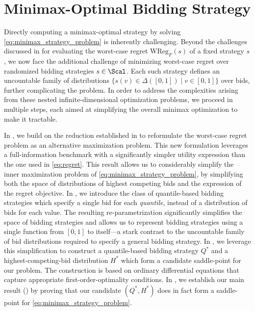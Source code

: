 

\section{Minimax-Optimal Bidding Strategy}\label{sec:minimax}

Directly computing a minimax-optimal strategy by solving \eqref{eq:minimax_strategy_problem} is inherently challenging. Beyond the challenges discussed in  for evaluating the worst-case regret  $\mathrm{WReg}_F(s)$ of a fixed strategy $s$, we now face the additional challenge of minimizing worst-case regret over randomized bidding strategies $s \in \Scal$. Each such strategy defines an uncountable family of distributions $\{s(v) \in \Delta([0,1]) \mid v \in [0,1] \}$ over bids, further complicating the problem. 
In order to address the complexities arising from these nested infinite-dimensional optimization problems, we proceed in multiple steps, each aimed at simplifying the overall minimax optimization to make it tractable. 

In , we build on the reduction established in  to reformulate the worst-case regret problem as an alternative maximization problem. This new formulation leverages a full-information benchmark with a significantly simpler utility expression than the one used in \eqref{eq:regret}.
This result allows us to considerably simplify the inner maximization problem of \eqref{eq:minimax_strategy_problem}, by simplifying both the space of distributions of highest competing bids and the expression of the regret objective.
 In , we introduce the class of quantile-based bidding strategies which specify a single bid for each \emph{quantile}, instead of a distribution of bids for each value. The resulting re-parametrization significantly simplifies the space of bidding strategies 
 and allows us to represent bidding strategies using a single function from $[0,1]$ to itself---a stark contrast to the uncountable family of bid distributions required to specify a general bidding strategy.
In , we leverage this simplification to construct a quantile-based bidding strategy $Q^*$ and a highest-competing-bid distribution $H^*$ which form a candidate saddle-point for our problem. The construction is based on ordinary differential equations that capture appropriate first-order-optimality conditions.
In , we establish our main result () by proving  that our candidate $(Q^*,H^*)$ does in fact form a saddle-point for \eqref{eq:minimax_strategy_problem}. 

